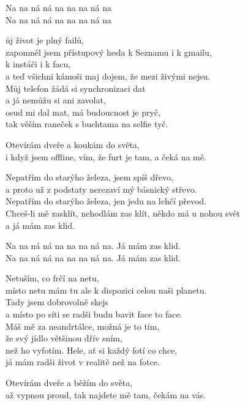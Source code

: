 
\re{}
Na na ná ná na na na ná na\\
Na na ná ná na na na ná na

\ve{}
ůj život je plný failů,\\
zapomněl jsem přístupový hesla k Seznamu i k gmailu,\\
k instáči i k facu,\\
a teď všichni kámoši maj dojem, že mezi živými nejsu.\\
Můj telefon žádá si synchronizaci dat\\
a já nemůžu si ani zavolat,\\
osud mi dal mat, má budoucnost je pryč,\\
tak věším raneček s buchtama na selfie tyč.

Otevírám dveře a koukám do světa,\\
i když jsem offline, vím, že furt je tam, a čeká na mě.

\cho{}
Nepatřím do starýho železa, jsem spíš dřevo,\\
a proto už z podstaty nerezaví mý básnický střevo.\\
Nepatřím do starýho železa, jen jedu na lehčí převod.\\
Chceš-li mě zasklít, nehodlám zas klít, někdo má u nohou svět\\
a já mám zas klid.


Na na ná ná na na na ná na. Já mám zas klid.\\
Na na ná ná na na na ná na. Já mám zas klid.

\ve{}
Netuším, co frčí na netu,\\
místo netu mám tu ale k dispozici celou naši planetu.\\
Tady jsem dobrovolně skejs\\
a místo po síti se radši budu bavit face to face.\\
Máš mě za neandrtálce, možná je to tím,\\
že svý jídlo většinou dřív sním,\\
než ho vyfotím. Hele, ať si každý fotí co chce,\\
já mám radši život v realitě než na fotce.

Otevírám dveře a běžím do světa,\\
až vypnou proud, tak najdete mě tam, čekám na vás.

